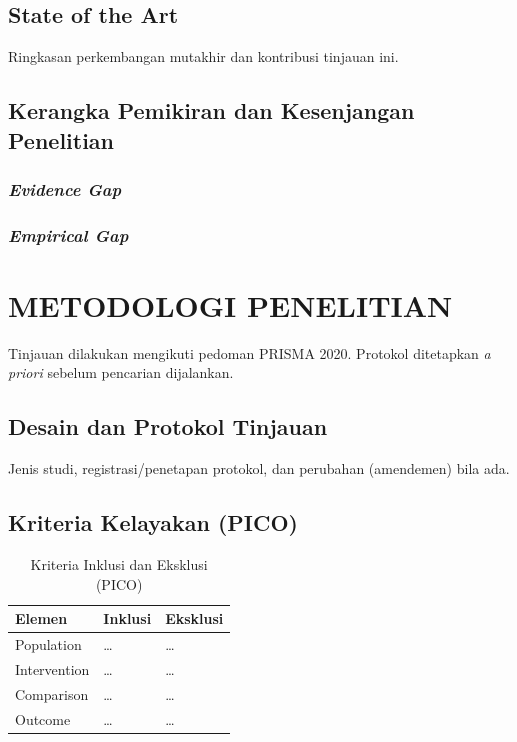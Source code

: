 \documentclass[12pt,a4paper,oneside]{report}
\begin{document}
\section{State of the Art}
Ringkasan perkembangan mutakhir dan kontribusi tinjauan ini.

\section{Kerangka Pemikiran dan Kesenjangan Penelitian}
\subsection{\textit{Evidence Gap}}
\subsection{\textit{Empirical Gap}}

\chapter{METODOLOGI PENELITIAN}\justifying
Tinjauan dilakukan mengikuti pedoman PRISMA 2020. Protokol ditetapkan
\emph{a priori} sebelum pencarian dijalankan.

\section{Desain dan Protokol Tinjauan}
Jenis studi, registrasi/penetapan protokol, dan perubahan (amendemen) bila ada.

\section{Kriteria Kelayakan (PICO)}
\begin{table}[ht]\centering
  \caption{Kriteria Inklusi dan Eksklusi (PICO)}\label{tab:pico}
  \begin{tabular}{>{\raggedright}p{2cm} p{5cm} p{5cm}}
    \toprule
    \textbf{Elemen} & \textbf{Inklusi} & \textbf{Eksklusi}\\
    \midrule
    Population   & \dots & \dots\\
    Intervention & \dots & \dots\\
    Comparison   & \dots & \dots\\
    Outcome      & \dots & \dots\\
    \bottomrule
  \end{tabular}
\end{table}
\end{document}

